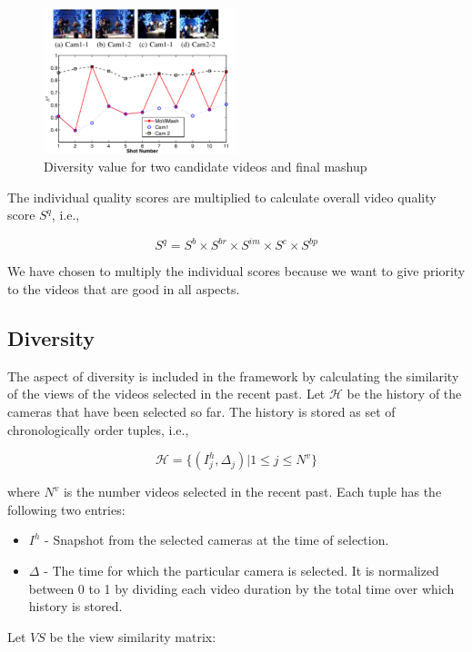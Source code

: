 \documentclass{sig-alternate}
\begin{document}
\begin{figure}[h]
	\centering
	\includegraphics[width=0.5\textwidth]{img5.png}
	\caption{Diversity value for two candidate videos and final mashup}
	\label{fig:mesh5}
\end{figure}
The individual quality scores are multiplied to calculate overall
video quality score $S^q$, i.e.,

\begin{equation}
    S^q = S^b \times S^{br} \times S^{im} \times S^c \times S^{bp}
\end{equation}

We have chosen to multiply the individual scores because we
want to give priority to the videos that are good in all aspects.

\subsection{Diversity}
The aspect of diversity is included in the framework by calculating the similarity of the views of the videos selected in the recent past. Let $\mathcal{H}$ be the history of the cameras that have been selected so far. The history is stored as set of chronologically order tuples, i.e.,

\begin{equation}
    \mathcal{H} = \{(I_{j}^{h} , \Delta _j )|1 \leq j \leq N^v\}
\end{equation}

where $N^v$ is the number videos selected in the recent past. Each
tuple has the following two entries:



\begin{itemize}
    \item $I^h$ - Snapshot from the selected cameras at the time of selection.
    \item $\Delta$ - The time for which the particular camera is selected. It is normalized between 0 to 1 by dividing each video duration by the total time over which history is stored.
\end{itemize}
Let $V S$ be the view similarity matrix:
\end{document}
